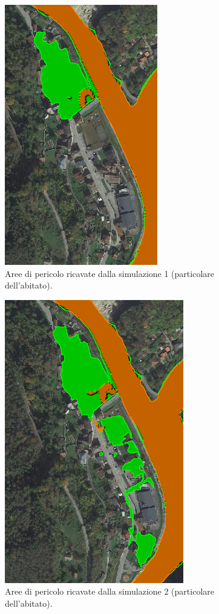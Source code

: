 \begin{figure}[htb] \centering
    \includegraphics[scale=0.5]{immagini/part_aree_pericolo_1.png}
    \caption{Aree di pericolo ricavate dalla simulazione 1 (particolare dell'abitato).}
    \label{figure:part_aree_pericolo_1}
\end{figure}

\begin{figure}[htb] \centering
    \includegraphics[scale=0.5]{immagini/part_aree_pericolo_2.png}
    \caption{Aree di pericolo ricavate dalla simulazione 2 (particolare dell'abitato).}
    \label{figure:part_aree_pericolo_2}
\end{figure}

